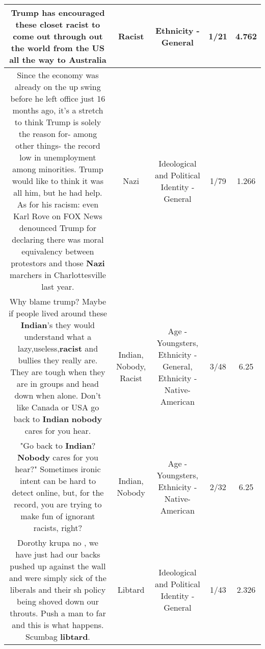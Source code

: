 \documentclass[11pt]{article}
\newlength\mylength
\begin{document}
\begin{center}
\begin{longtable}{|C{.65\mylength}|C{.30\mylength}|C{.12\mylength}|C{.12\mylength}|C{.12\mylength}|}
  \small Trump has encouraged these closet \textbf{racist} to come out through out the world from the US all the way to Australia\normalsize   & Racist & Ethnicity - General & 1/21 & 4.762 \\  \hline
  \small Since the economy was already on the up swing before he left office just 16 months ago, it's a stretch to think Trump is solely the reason for- among other things- the record low in unemployment among minorities. Trump would like to think it was all him, but he had help. As for his racism: even Karl Rove on FOX News denounced Trump for declaring there was moral equivalency between protestors and those \textbf{Nazi} marchers in Charlottesville last year.\normalsize   & Nazi &  Ideological and Political Identity - General & 1/79 & 1.266 \\  \hline
  \small Why blame trump? Maybe if people lived around these \textbf{Indian}'s they would understand what a lazy,useless,\textbf{racist} and bullies they really are. They are tough when they are in groups and head down when alone. Don't like Canada or USA go back to \textbf{Indian} \textbf{nobody} cares for you hear.\normalsize   & Indian, Nobody, Racist & Age - Youngsters, Ethnicity - General, Ethnicity - Native-American & 3/48 & 6.25 \\  \hline
  \small "Go back to \textbf{Indian}? \textbf{Nobody} cares for you hear?" Sometimes ironic intent can be hard to detect online, but, for the record, you are trying to make fun of ignorant racists, right?\normalsize   & Indian, Nobody & Age - Youngsters, Ethnicity - Native-American & 2/32 & 6.25 \\  \hline
  \small Dorothy krupa no , we have just had our backs pushed up against the wall and were simply sick of the liberals and their sh policy being shoved down our throuts. Push a man to far and this is what happens. Scumbag \textbf{libtard}.\normalsize   & Libtard &  Ideological and Political Identity - General & 1/43 & 2.326 \\  \hline

\end{longtable}
\end{center}
\end{document}
